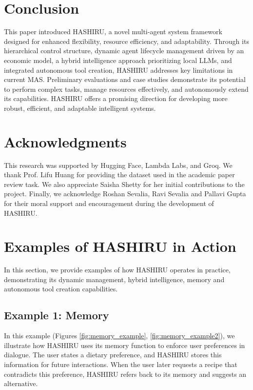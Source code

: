 \documentclass[conference]{IEEEtran}
\begin{document}
\section{Conclusion}
\label{sec:conclusion}

This paper introduced HASHIRU, a novel multi-agent system framework designed for enhanced flexibility, resource efficiency, and adaptability. Through its hierarchical control structure, dynamic agent lifecycle management driven by an economic model, a hybrid intelligence approach prioritizing local LLMs, and integrated autonomous tool creation, HASHIRU addresses key limitations in current MAS. Preliminary evaluations and case studies demonstrate its potential to perform complex tasks, manage resources effectively, and autonomously extend its capabilities. HASHIRU offers a promising direction for developing more robust, efficient, and adaptable intelligent systems.

\section*{Acknowledgments}
This research was supported by Hugging Face, Lambda Labs, and Groq. We thank Prof. Lifu Huang for providing the dataset used in the academic paper review task. We also appreciate Saisha Shetty for her initial contributions to the project. Finally, we acknowledge Roshan Sevalia, Ravi Sevalia and Pallavi Gupta for their moral support and encouragement during the development of HASHIRU.



\appendix
\section{Examples of HASHIRU in Action}
\label{sec:examples}
In this section, we provide examples of how HASHIRU operates in practice, demonstrating its dynamic management, hybrid intelligence, memory and autonomous tool creation capabilities.

\subsection{Example 1: Memory}
In this example (Figures \ref{fig:memory_example}, \ref{fig:memory_example2}), we illustrate how HASHIRU uses its memory function to enforce user preferences in dialogue. The user states a dietary preference, and HASHIRU stores this information for future interactions. When the user later requests a recipe that contradicts this preference, HASHIRU refers back to its memory and suggests an alternative.
\end{document}

